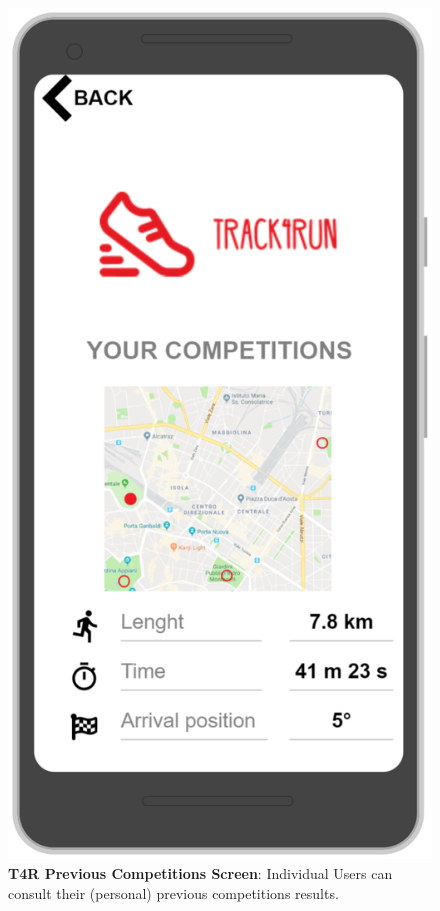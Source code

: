 \begin{figure}[H]
\centering
\includegraphics[scale = 0.5]{Mocks/Mobile_T4R_Prev_Competitions.PNG}
\caption{\textbf{T4R Previous Competitions Screen}: Individual Users can consult their (personal) previous competitions results.}
\end{figure}

